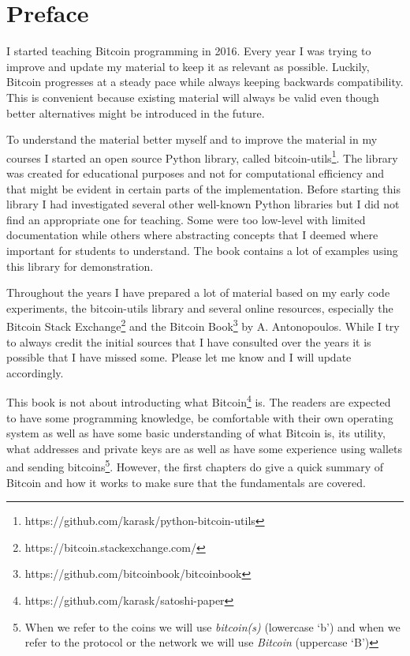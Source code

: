 
\section{Preface}
I started teaching Bitcoin programming in 2016. Every year I was trying to improve and update my material to keep it as relevant as possible. Luckily, Bitcoin progresses at a steady pace while always keeping backwards compatibility. This is convenient because existing material will always be valid even though better alternatives might be introduced in the future.

To understand the material better myself and to improve the material in my courses I started an open source Python library, called bitcoin-utils\footnote{https://github.com/karask/python-bitcoin-utils}. The library was created for educational purposes and not for computational efficiency and that might be evident in certain parts of the implementation. Before starting this library I had investigated several other well-known Python libraries but I did not find an appropriate one for teaching. Some were too low-level with limited documentation while others where abstracting concepts that I deemed where important for students to understand. The book contains a lot of examples using this library for demonstration.

Throughout the years I have prepared a lot of material based on my early code experiments, the bitcoin-utils library and several online resources, especially the Bitcoin Stack Exchange\footnote{https://bitcoin.stackexchange.com/} and the Bitcoin Book\footnote{https://github.com/bitcoinbook/bitcoinbook} by A. Antonopoulos. While I try to always credit the initial sources that I have consulted over the years it is possible that I have missed some. Please let me know and I will update accordingly.

This book is not about introducting what Bitcoin\footnote{https://github.com/karask/satoshi-paper} is. The readers are expected to have some programming knowledge, be comfortable with their own operating system as well as have some basic understanding of what Bitcoin is, its utility, what addresses and private keys are as well as have some experience using wallets and sending bitcoins\footnote{When we refer to the coins we will use \emph{bitcoin(s)} (lowercase `b') and when we refer to the protocol or the network we will use \emph{Bitcoin} (uppercase `B')}. However, the first chapters do give a quick summary of Bitcoin and how it works to make sure that the fundamentals are covered.

